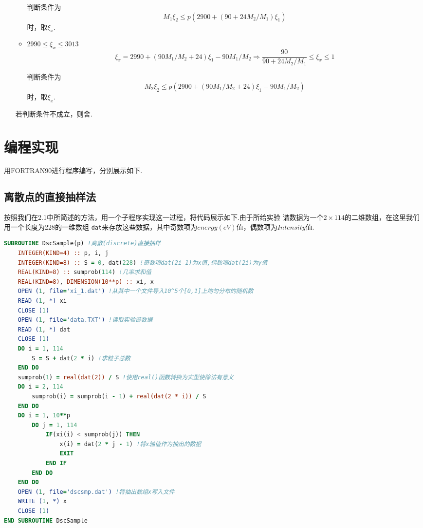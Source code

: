 \documentclass[12pt,a4paper,utf8]{ctexart}
\begin{document}
\begin{enumerate}
\begin{itemize}
            判断条件为
            \begin{equation}
                M_1 \xi_2 \leq p(2900 + (90 + 24M_2/M_1)\xi_1)
            \end{equation}
            时，取$\xi_x$.

            \item $2990 \leq \xi_x \leq 3013$
            \begin{equation}
                \xi_x = 2990 + (90M_1/M_2 + 24)\xi_1 - 90M_1/M_2
                \Rightarrow\frac{90}{90 + 24M_2/M_1} \leq \xi_x \leq 1
            \end{equation}

            判断条件为
            \begin{equation}
                M_2 \xi_2 \leq 
            p(2900 + (90M_1/M_2 + 24)\xi_1 - 90M_1/M_2)
            \end{equation}
            时，取$\xi_x$.
        \end{itemize}
        若判断条件不成立，则舍.
    \end{enumerate}
\section{编程实现}

用FORTRAN90进行程序编写，分别展示如下.

\subsection{离散点的直接抽样法}

按照我们在2.1中所简述的方法，用一个子程序实现这一过程，将代码展示如下.由于所给实验
谱数据为一个$2\times 114$的二维数组，在这里我们用一个长度为228的一维数组
\texttt{dat}来存放这些数据，其中奇数项为$energy(eV)$值，偶数项为$Intensity$值.
\begin{framed}
\begin{lstlisting}[language=Fortran]
SUBROUTINE DscSample(p) !离散(discrete)直接抽样
    INTEGER(KIND=4) :: p, i, j
    INTEGER(KIND=8) :: S = 0, dat(228) !奇数项dat(2i-1)为x值,偶数项dat(2i)为y值
    REAL(KIND=8) :: sumprob(114) !几率求和值
    REAL(KIND=8), DIMENSION(10**p) :: xi, x
    OPEN (1, file='xi_1.dat') !从其中一个文件导入10^5个[0,1]上均匀分布的随机数
    READ (1, *) xi
    CLOSE (1)
    OPEN (1, file='data.TXT') !读取实验谱数据
    READ (1, *) dat
    CLOSE (1)
    DO i = 1, 114
        S = S + dat(2 * i) !求粒子总数
    END DO
    sumprob(1) = real(dat(2)) / S !使用real()函数转换为实型使除法有意义
    DO i = 2, 114
        sumprob(i) = sumprob(i - 1) + real(dat(2 * i)) / S
    END DO
    DO i = 1, 10**p
        DO j = 1, 114 
            IF(xi(i) < sumprob(j)) THEN
                x(i) = dat(2 * j - 1) !将x轴值作为抽出的数据
                EXIT
            END IF
        END DO
    END DO
    OPEN (1, file='dscsmp.dat') !将抽出数组x写入文件
    WRITE (1, *) x
    CLOSE (1)
END SUBROUTINE DscSample
\end{lstlisting}
\end{framed}
\end{document}
